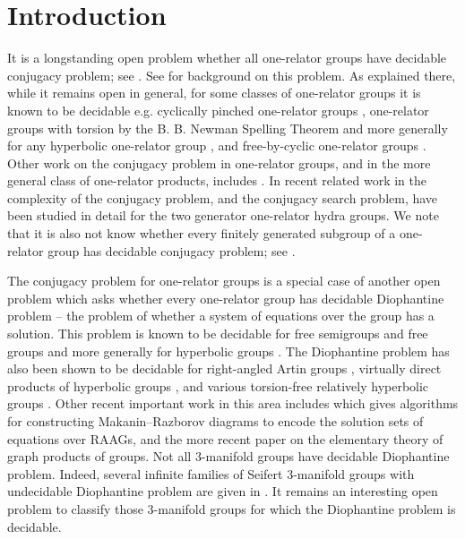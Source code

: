 \documentclass[11pt]{amsart}
\theoremstyle{definition}
\numberwithin{theorem}{section}
\begin{document}
\section{Introduction}
It is a longstanding open problem whether all one-relator groups have decidable
conjugacy problem; see \cite[Problem (O5)]{baumslag2002open}.
See \cite[Section~1.8]{CFMarcoOneRelatorSurvey} for background on this problem. As explained there, while it remains open in general, for some classes of one-relator groups it is known to be decidable e.g. cyclically pinched one-relator groups \cite{Lipschutz1966}, one-relator groups with torsion by the B. B. Newman Spelling Theorem 
and more generally for any hyperbolic one-relator group \cite{Gromov1987}, and free-by-cyclic one-relator groups \cite{Bogopolski2006}. 
Other work on the conjugacy problem in one-relator groups, and in the more general class of one-relator products, includes 
\cite{Duncan1991, Minasyan2013, Pride2008}.
In recent related work in \cite{bridson2025conjugacy} the complexity of the conjugacy problem, and the conjugacy search problem, have been studied in detail for the two generator one-relator hydra groups.
We note that it is also not know whether every finitely generated subgroup of a one-relator group has decidable conjugacy problem; see 
\cite[Problem 1.8.2]{CFMarcoOneRelatorSurvey}.

The conjugacy problem for one-relator groups is a special case of another open problem which asks whether every one-relator group has decidable Diophantine problem -- the problem of whether a system of equations over the group has a solution. This problem is known to be decidable for free semigroups and free groups \cite{Makanin_semigroups, Makanin_eqns_free_group, Razborov_thesis} and more generally for hyperbolic groups \cite{dahmani_guirardel, Sela}. 
The Diophantine problem has also been shown to be decidable for right-angled Artin groups \cite{DiekertMuscholl}, virtually direct products of hyperbolic groups \cite{CiobanuHoltRees}, and various torsion-free relatively hyperbolic groups \cite{dahmani2009existential}. 
Other recent important work in this area includes 
\cite{CasalsRuiz2011} which gives algorithms for constructing Makanin--Razborov diagrams to encode the solution sets of equations over RAAGs, 
and 
the more recent paper \cite{CasalsRuiz2024} on the elementary theory of graph products of groups.
Not all $3$-manifold groups have decidable Diophantine problem. Indeed, 
several infinite families of Seifert 3-manifold groups with undecidable Diophantine problem are given in \cite{GrayLevineArxiv251207690}. 
It remains an interesting open problem to classify those 3-manifold groups for which the Diophantine problem is decidable.  
\end{document}

